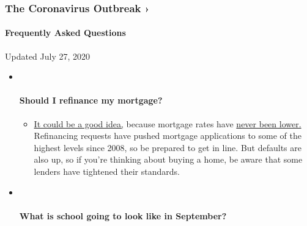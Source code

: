 \hypertarget{the-coronavirus-outbreak-}{%
\subsubsection{The Coronavirus Outbreak
›}\label{the-coronavirus-outbreak-}}

\hypertarget{frequently-asked-questions}{%
\paragraph{Frequently Asked
Questions}\label{frequently-asked-questions}}

Updated July 27, 2020

\begin{itemize}
\item ~
  \hypertarget{should-i-refinance-my-mortgage}{%
  \paragraph{Should I refinance my
  mortgage?}\label{should-i-refinance-my-mortgage}}

  \begin{itemize}
  \tightlist
  \item
    \href{https://www.nytimes.com/article/coronavirus-money-unemployment.html?action=click\&pgtype=Article\&state=default\&region=MAIN_CONTENT_3\&context=storylines_faq}{It
    could be a good idea,} because mortgage rates have
    \href{https://www.nytimes.com/2020/07/16/business/mortgage-rates-below-3-percent.html?action=click\&pgtype=Article\&state=default\&region=MAIN_CONTENT_3\&context=storylines_faq}{never
    been lower.} Refinancing requests have pushed mortgage applications
    to some of the highest levels since 2008, so be prepared to get in
    line. But defaults are also up, so if you're thinking about buying a
    home, be aware that some lenders have tightened their standards.
  \end{itemize}
\item ~
  \hypertarget{what-is-school-going-to-look-like-in-september}{%
  \paragraph{What is school going to look like in
  September?}\label{what-is-school-going-to-look-like-in-september}}


\end{itemize}
